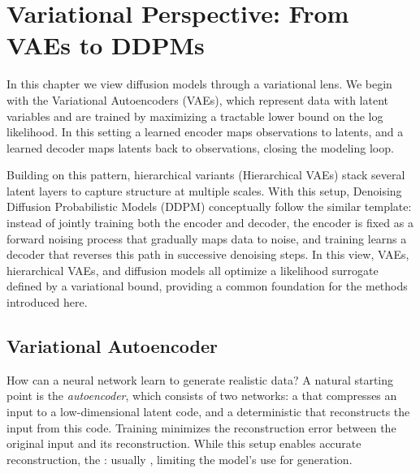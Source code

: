 \chapter{Variational Perspective: From VAEs to DDPMs}\label{ch:variational}


In this chapter we view diffusion models through a variational lens. We begin with the Variational Autoencoders (VAEs), which represent data with latent variables and are trained by maximizing a tractable lower bound on the log likelihood. In this setting a learned encoder maps observations to latents, and a learned decoder maps latents back to observations, closing the modeling loop. 

Building on this pattern, hierarchical variants (Hierarchical VAEs) stack several latent layers to capture structure at multiple scales. With this setup, Denoising Diffusion Probabilistic Models (DDPM) conceptually follow the similar template: instead of jointly training both the encoder and decoder, the encoder is fixed as a forward noising process that gradually maps data to noise, and training learns a decoder that reverses this path in successive denoising steps. In this view, VAEs, hierarchical VAEs, and diffusion models all optimize a likelihood surrogate defined by a variational bound, providing a common foundation for the methods introduced here.




\newpage
\section{Variational Autoencoder}\label{sec:vae}
How can a neural network learn to generate realistic data?  
A natural starting point is the \emph{autoencoder}, which consists of two networks:  
a  that compresses an input to a low-dimensional latent code, and a deterministic  that reconstructs the input from this code.  
Training minimizes the reconstruction error between the original input and its reconstruction.  
While this setup enables accurate reconstruction, the :  usually , limiting the model’s use for generation.



